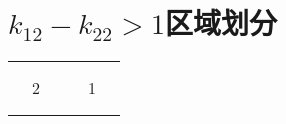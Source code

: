 \section{\texorpdfstring{$k_{12} - k_{22} > 1$}的区域划分}

\begin{table}[h]
    \begin{tabular}{|ccclclcc|}
        \hline
        \multicolumn{2}{|c|}{\multirow{3}{*}{}} & \multicolumn{6}{c|}{}                                                                                                                               \\ \cline{3-8}
        \multicolumn{2}{|c|}{}                  & \multicolumn{2}{c|}{\multirow{3}{*}{}} & \multicolumn{3}{c|}{\multirow{2}{*}{}} & \multirow{3}{*}{}                                                 \\
        \multicolumn{2}{|c|}{}                  & \multicolumn{2}{c|}{}                  & \multicolumn{3}{c|}{}                  &                                                                   \\ \cline{1-2} \cline{5-7}
        \multicolumn{1}{|c|}{\multirow{3}{*}{}} & \multicolumn{1}{c|}{2}                 & \multicolumn{2}{c|}{}                  & \multicolumn{2}{c|}{\multirow{3}{*}{}} & \multicolumn{1}{c|}{1} & \\ \cline{2-4} \cline{7-8}
        \multicolumn{1}{|c|}{}                  & \multicolumn{3}{c|}{\multirow{2}{*}{}} & \multicolumn{2}{c|}{}                  & \multicolumn{2}{c|}{\multirow{3}{*}{}}                            \\
        \multicolumn{1}{|c|}{}                  & \multicolumn{3}{c|}{}                  & \multicolumn{2}{c|}{}                  & \multicolumn{2}{c|}{}                                             \\ \cline{1-6}
        \multicolumn{6}{|c|}{}                  & \multicolumn{2}{c|}{}                                                                                                                               \\ \hline
    \end{tabular}
\end{table}
\endinput
